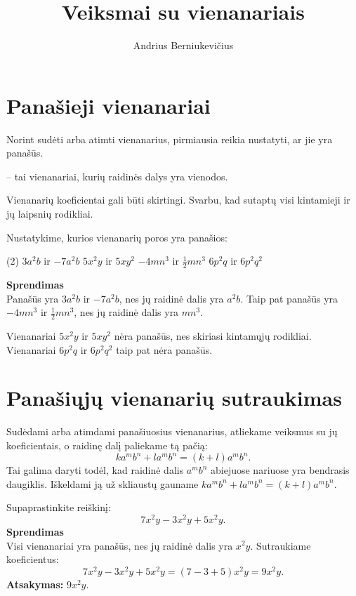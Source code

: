 \documentclass[11pt,a4paper]{scrartcl}
\title{Veiksmai su vienanariais}
\author{Andrius Berniukevičius}
\begin{document}
\maketitle

\section{Panašieji vienanariai}

Norint sudėti arba atimti vienanarius, pirmiausia reikia nustatyti, ar jie yra panašūs.

\begin{definition}
 -- tai vienanariai, kurių raidinės dalys yra vienodos.
\end{definition}

Vienanarių koeficientai gali būti skirtingi. Svarbu, kad sutaptų visi kintamieji ir jų laipsnių rodikliai.

\begin{example}
Nustatykime, kurios vienanarių poros yra panašios:
\begin{tasks}[style=itemize](2)
	\task $3a^2b$ ir $-7a^2b$
	\task $5x^2y$ ir $5xy^2$
	\task $-4mn^3$ ir $\frac{1}{2}mn^3$
	\task $6p^2q$ ir $6p^2q^2$
\end{tasks}
\textbf{Sprendimas}\\
Panašūs yra $3a^2b$ ir $-7a^2b$, nes jų raidinė dalis yra $a^2b$. Taip pat panašūs yra $-4mn^3$ ir $\frac{1}{2}mn^3$, nes jų raidinė dalis yra $mn^3$.

Vienanariai $5x^2y$ ir $5xy^2$ nėra panašūs, nes skiriasi kintamųjų rodikliai. Vienanariai $6p^2q$ ir $6p^2q^2$ taip pat nėra panašūs.
\end{example}

\section{Panašiųjų vienanarių sutraukimas}

\begin{monomialrule}
Sudėdami arba atimdami panašiuosius vienanarius, atliekame veiksmus su jų koeficientais, o raidinę dalį paliekame tą pačią:
\[
ka^mb^n + la^mb^n = (k+l)a^mb^n.
\]
Tai galima daryti todėl, kad raidinė dalis $a^mb^n$ abiejuose nariuose yra bendrasis daugiklis. Iškeldami ją už skliaustų gauname $ka^mb^n + la^mb^n=(k+l)a^mb^n$.
\end{monomialrule}

\begin{example}
Supaprastinkite reiškinį:
\[
7x^2y-3x^2y+5x^2y.
\]
\textbf{Sprendimas}\\
Visi vienanariai yra panašūs, nes jų raidinė dalis yra $x^2y$. Sutraukiame koeficientus:
\[
7x^2y-3x^2y+5x^2y=(7-3+5)x^2y=9x^2y.
\]
\textbf{Atsakymas:} $9x^2y$.
\end{example}
\end{document}
